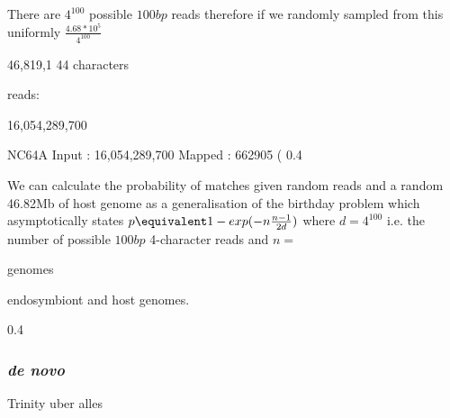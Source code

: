 There are \(4^{100}\) possible \(100bp\) reads
therefore if we randomly sampled from this
uniformly 
\(\frac{4.68*10^{5}}{4^{100}}\)





46,819,1  44 characters

reads:


16,054,289,700

NC64A
Input     : 16,054,289,700
Mapped   :    662905 ( 0.4%

We can calculate the probability of matches given
random reads and a random 46.82Mb of host genome
as a generalisation of the birthday 
problem which asymptotically states
\(p\equivalent 1 - exp(-n\frac{n-1}{2d})\)
where \(d = 4^{100}\) i.e. the number of possible
\(100bp\) 4-character reads and \(n =\) 













genomes


endosymbiont
and host genomes.




 0.4%



\subsubsection{\textit{de novo}}

Trinity uber alles



